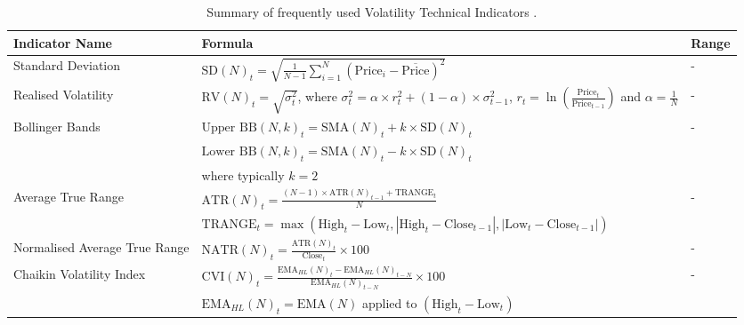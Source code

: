 \begin{table}[htb!]
\centering
\footnotesize
\caption{Summary of frequently used Volatility Technical Indicators \cite{jansen_machine_2020}.}
\label{Tables:VolatilityIndicators}
\begin{tabularx}{\textwidth}{@{}lXl@{}}
\toprule
\textbf{Indicator Name} & \textbf{Formula} & \textbf{Range} \\
\midrule
Standard Deviation & $\text{SD}(N)_t = \sqrt{\frac{1}{N-1} \sum_{i=1}^{N} (\text{Price}_i - \overline{\text{Price}})^2}$ & - \\
\addlinespace
Realised Volatility & $\text{RV}(N)_t = \sqrt{\sigma^2_t}$, where $\sigma^2_t = \alpha \times r_t^2 + (1 - \alpha) \times \sigma^2_{t-1}$, $r_t = \ln\left(\frac{\text{Price}_t}{\text{Price}_{t-1}}\right)$ and $\alpha = \frac{1}{N}$ & - \\
\addlinespace
Bollinger Bands & $\text{Upper BB}(N, k)_t = \text{SMA}(N)_t + k \times \text{SD}(N)_t$ & - \\
\addlinespace
& $\text{Lower BB}(N, k)_t = \text{SMA}(N)_t - k \times \text{SD}(N)_t$ & \\
\addlinespace
& where typically $ k = 2 $& \\
\addlinespace
Average True Range & $\text{ATR}(N)_t = \frac{(N - 1) \times \text{ATR}(N)_{t-1} + \text{TRANGE}_t}{N}$ & - \\
\addlinespace
& $\text{TRANGE}_t = \max(\text{High}_t - \text{Low}_t, |\text{High}_t - \text{Close}_{t-1}|, |\text{Low}_t - \text{Close}_{t-1}|)$ & \\
\addlinespace
Normalised Average True Range & $\text{NATR}(N)_t = \frac{\text{ATR}(N)_t}{\text{Close}_t} \times 100$ & - \\
\addlinespace
Chaikin Volatility Index & $\text{CVI}(N)_t = \frac{\text{EMA}_{HL}(N)_t - \text{EMA}_{HL}(N)_{t-N}}{\text{EMA}_{HL}(N)_{t-N}} \times 100$ & - \\
\addlinespace
& $\text{EMA}_{HL}(N)_t = \text{EMA}(N)$ applied to $(\text{High}_t - \text{Low}_t)$ & \\
\bottomrule
\end{tabularx}
\end{table}